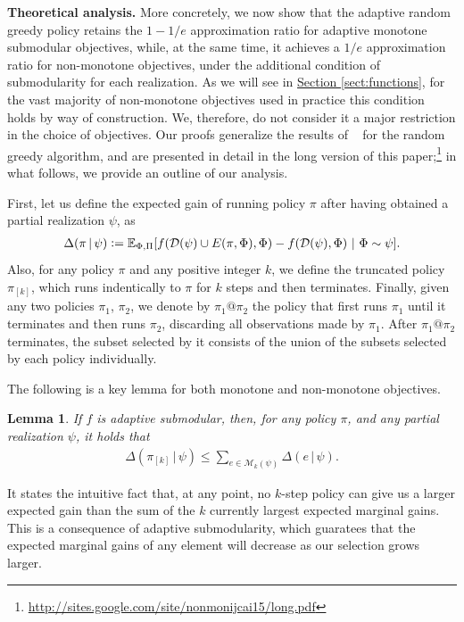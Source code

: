 \documentclass{article}
\newcommand{\sectref}[1]{\hyperref[#1]{Section \ref*{#1}}}
\newtheorem{lemma}{Lemma}
\newcommand{\defeq}{\vcentcolon=}
\newcommand{\mmid}{\,\vert\,}
\newcommand{\D}[2]{\Delta(#1\mmid#2)}
\newcommand{\pik}{\pi_{[k]}}
\newcommand{\dom}{\mathcal{D}}
\newcommand{\Mk}{\mathcal{M}_k}
\newcommand{\citet}[1]{\citeauthor{#1}~\shortcite{#1}}
\renewcommand{\paragraph}[1]{\vspace{0.3em}\noindent\textbf{#1.}\makebox[0.5em]{}}
\begin{document}
\paragraph{Theoretical analysis}
More concretely, we now show that the adaptive random greedy policy retains the $1-1/e$ approximation ratio for adaptive monotone submodular objectives, while, at the same time, it achieves a $1/e$ approximation ratio for non-monotone objectives, under the additional condition of submodularity for each realization.
As we will see in \sectref{sect:functions}, for the vast majority of non-monotone objectives used in practice this condition holds by way of construction.
We, therefore, do not consider it a major restriction in the choice of objectives.
Our proofs generalize the results of \citet{buchbinder14} for the random greedy algorithm, and are presented in detail in the long version of this paper;\footnote{\url{http://sites.google.com/site/nonmonijcai15/long.pdf}} in what follows, we provide an outline of our analysis.

First, let us define the expected gain of running policy $\pi$ after having obtained a partial realization $\psi$, as
{\small
\begin{align*}
  \D{\pi}{\psi} \defeq \E[\Phi,\Pi]{f(\dom(\psi) \cup E(\pi, \Phi), \Phi) - f(\dom(\psi), \Phi)}[\Phi \sim \psi].
\end{align*}}
Also, for any policy $\pi$ and any positive integer $k$, we define the truncated policy $\pik$, which runs indentically to $\pi$ for $k$ steps and then terminates.
Finally, given any two policies $\pi_1$, $\pi_2$, we denote by $\pi_1@\pi_2$ the policy that first runs $\pi_1$ until it terminates and then runs $\pi_2$, discarding all observations made by $\pi_1$.
After $\pi_1@\pi_2$ terminates, the subset selected by it consists of the union of the subsets selected by each policy individually.

The following is a key lemma for both monotone and non-monotone objectives.
\setcounter{lemma}{0}
\begin{lemma}\label{lem:submod}
  If $f$ is adaptive submodular, then, for any policy $\pi$, and any partial realization $\psi$, it holds that
  \begin{align*}
    \D{\pik}{\psi} \leq \sum_{e \in \Mk(\psi)} \D{e}{\psi}.
  \end{align*}
\end{lemma}
\noindent It states the intuitive fact that, at any point, no $k$-step policy can give us a larger expected gain than the sum of the $k$ currently largest expected marginal gains.
This is a consequence of adaptive submodularity, which guaratees that the expected marginal gains of any element will decrease as our selection grows larger.
\end{document}
